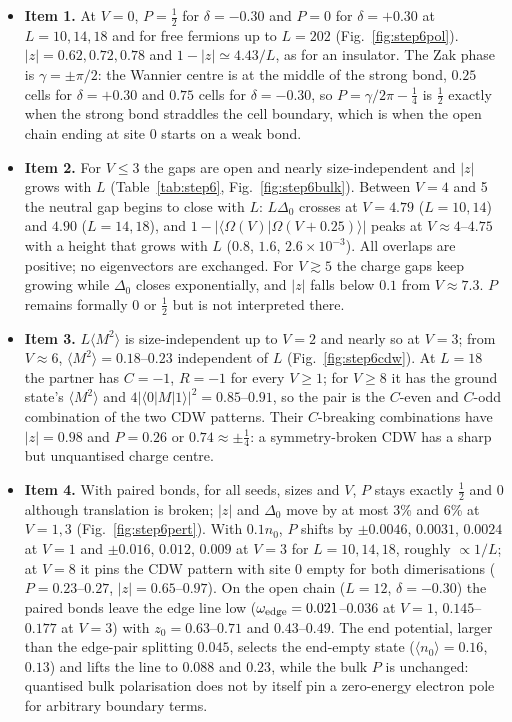 \documentclass[11pt,a4paper]{article}
\begin{document}
\begin{itemize}
  \item \textbf{Item 1.} At $V=0$, $P=\tfrac12$ for $\delta=-0.30$ and $P=0$ for $\delta=+0.30$ at $L=10,14,18$ and for free fermions up to $L=202$ (Fig.~\ref{fig:step6pol}). $|z|=0.62,0.72,0.78$ and $1-|z|\simeq4.43/L$, as for an insulator. The Zak phase is $\gamma=\pm\pi/2$: the Wannier centre is at the middle of the strong bond, $0.25$ cells for $\delta=+0.30$ and $0.75$ cells for $\delta=-0.30$, so $P=\gamma/2\pi-\tfrac14$ is $\tfrac12$ exactly when the strong bond straddles the cell boundary, which is when the open chain ending at site 0 starts on a weak bond.
  \item \textbf{Item 2.} For $V\le3$ the gaps are open and nearly size-independent and $|z|$ grows with $L$ (Table~\ref{tab:step6}, Fig.~\ref{fig:step6bulk}). Between $V=4$ and 5 the neutral gap begins to close with $L$: $L\Delta_0$ crosses at $V=4.79$ ($L=10,14$) and $4.90$ ($L=14,18$), and $1-|\langle\Omega(V)|\Omega(V+0.25)\rangle|$ peaks at $V\approx4$--$4.75$ with a height that grows with $L$ ($0.8$, $1.6$, $2.6\times10^{-3}$). All overlaps are positive; no eigenvectors are exchanged. For $V\gtrsim5$ the charge gaps keep growing while $\Delta_0$ closes exponentially, and $|z|$ falls below $0.1$ from $V\approx7.3$. $P$ remains formally $0$ or $\tfrac12$ but is not interpreted there.
  \item \textbf{Item 3.} $L\langle M^2\rangle$ is size-independent up to $V=2$ and nearly so at $V=3$; from $V\approx6$, $\langle M^2\rangle=0.18$--$0.23$ independent of $L$ (Fig.~\ref{fig:step6cdw}). At $L=18$ the partner has $C=-1$, $R=-1$ for every $V\ge1$; for $V\ge8$ it has the ground state's $\langle M^2\rangle$ and $4|\langle0|M|1\rangle|^2=0.85$--$0.91$, so the pair is the $C$-even and $C$-odd combination of the two CDW patterns. Their $C$-breaking combinations have $|z|=0.98$ and $P=0.26$ or $0.74\approx\pm\tfrac14$: a symmetry-broken CDW has a sharp but unquantised charge centre.
  \item \textbf{Item 4.} With paired bonds, for all seeds, sizes and $V$, $P$ stays exactly $\tfrac12$ and $0$ although translation is broken; $|z|$ and $\Delta_0$ move by at most 3\% and 6\% at $V=1,3$ (Fig.~\ref{fig:step6pert}). With $0.1n_0$, $P$ shifts by $\pm0.0046$, $0.0031$, $0.0024$ at $V=1$ and $\pm0.016$, $0.012$, $0.009$ at $V=3$ for $L=10,14,18$, roughly $\propto1/L$; at $V=8$ it pins the CDW pattern with site 0 empty for both dimerisations ($P=0.23$--$0.27$, $|z|=0.65$--$0.97$). On the open chain ($L=12$, $\delta=-0.30$) the paired bonds leave the edge line low ($\omega_{\rm edge}=0.021$--$0.036$ at $V=1$, $0.145$--$0.177$ at $V=3$) with $z_0=0.63$--$0.71$ and $0.43$--$0.49$. The end potential, larger than the edge-pair splitting $0.045$, selects the end-empty state ($\langle n_0\rangle=0.16$, $0.13$) and lifts the line to $0.088$ and $0.23$, while the bulk $P$ is unchanged: quantised bulk polarisation does not by itself pin a zero-energy electron pole for arbitrary boundary terms.

\end{itemize}
\end{document}
